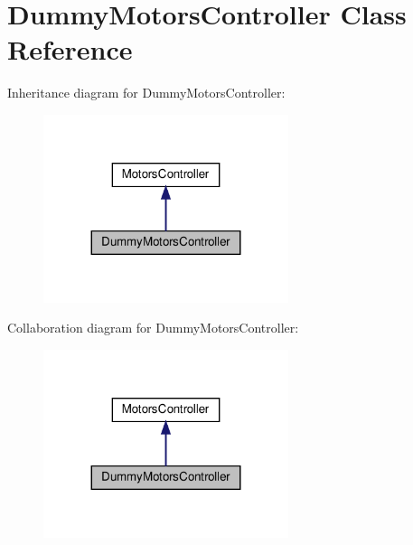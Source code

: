 \hypertarget{classDummyMotorsController}{}\section{Dummy\+Motors\+Controller Class Reference}
\label{classDummyMotorsController}


Inheritance diagram for Dummy\+Motors\+Controller\+:
\nopagebreak
\begin{figure}[H]
\begin{center}
\leavevmode
\includegraphics[width=203pt]{classDummyMotorsController__inherit__graph}
\end{center}
\end{figure}


Collaboration diagram for Dummy\+Motors\+Controller\+:
\nopagebreak
\begin{figure}[H]
\begin{center}
\leavevmode
\includegraphics[width=203pt]{classDummyMotorsController__coll__graph}
\end{center}
\end{figure}
